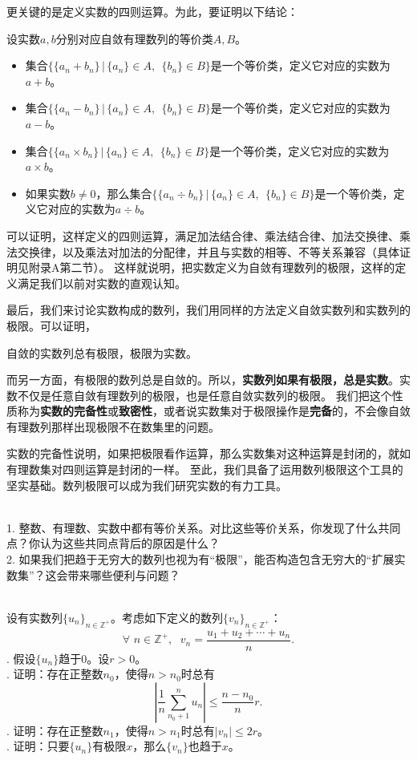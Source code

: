 \documentclass[12pt,UTF8,fontset=none]{ctexbook}
\begin{document}
更关键的是定义实数的四则运算。为此，要证明以下结论：
\begin{tm}
    设实数$a,b$分别对应自敛有理数列的等价类$A,B$。
    \begin{itemize}
        \item 集合$\{\{a_n + b_n\} \, | \, \{a_n\}\in A,\;\, \{b_n\}\in B\}$是一个等价类，定义它对应的实数为$a + b$。
        \item 集合$\{\{a_n - b_n\} \, | \, \{a_n\}\in A,\;\, \{b_n\}\in B\}$是一个等价类，定义它对应的实数为$a - b$。
        \item 集合$\{\{a_n \times b_n\} \, | \, \{a_n\}\in A,\;\, \{b_n\}\in B\}$是一个等价类，定义它对应的实数为$a \times b$。
        \item 如果实数$b\neq 0$，那么集合$\{\{a_n \div b_n\} \, | \, \{a_n\}\in A,\;\, \{b_n\}\in B\}$是一个等价类，定义它对应的实数为$a \div b$。
    \end{itemize}  
\end{tm}
可以证明，这样定义的四则运算，满足加法结合律、乘法结合律、加法交换律、乘法交换律，以及乘法对加法的分配律，并且与实数的相等、不等关系兼容（具体证明见附录A第二节）。
这样就说明，把实数定义为自敛有理数列的极限，这样的定义满足我们以前对实数的直观认知。

最后，我们来讨论实数构成的数列，我们用同样的方法定义自敛实数列和实数列的极限。可以证明，
\begin{tm}
    自敛的实数列总有极限，极限为实数。
\end{tm}
而另一方面，有极限的数列总是自敛的。所以，\textbf{实数列如果有极限，总是实数}。实数不仅是任意自敛有理数列的极限，也是任意自敛实数列的极限。
我们把这个性质称为\textbf{实数的完备性}或\textbf{致密性}，或者说实数集对于极限操作是\textbf{完备}的，不会像自敛有理数列那样出现极限不在数集里的问题。

实数的完备性说明，如果把极限看作运算，那么实数集对这种运算是封闭的，就如有理数集对四则运算是封闭的一样。
至此，我们具备了运用数列极限这个工具的坚实基础。数列极限可以成为我们研究实数的有力工具。

\begin{sk}
    \mbox{}\\
    1. 整数、有理数、实数中都有等价关系。对比这些等价关系，你发现了什么共同点？你认为这些共同点背后的原因是什么？\\
    2. 如果我们把趋于无穷大的数列也视为有“极限”，能否构造包含无穷大的“扩展实数集”？这会带来哪些便利与问题？
\end{sk}

\begin{xt}
    \mbox{} \\
    设有实数列$\{u_n\}_{n\in\mathbb{Z}^+}$。考虑如下定义的数列$\{v_n\}_{n\in\mathbb{Z}^+}$：
    $$ \forall \,\, n\in\mathbb{Z}^+, \;\,\, v_n = \frac{u_1 + u_2 + \cdots + u_n}{n}. $$
    . 假设$\{u_n\}$趋于$0$。设$r>0$。\\
    . 证明：存在正整数$n_0$，使得$n>n_0$时总有
    $$ \left| \frac{1}{n} \sum_{n_0+1}^n u_n \right| \leqslant \frac{n-n_0}{n}r.$$
    . 证明：存在正整数$n_1$，使得$n>n_1$时总有$|v_n| \leqslant 2r$。\\
    . 证明：只要$\{u_n\}$有极限$x$，那么$\{v_n\}$也趋于$x$。
\end{xt}
\end{document}

